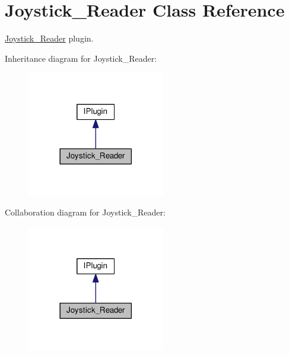 \hypertarget{class_joystick___reader}{}\section{Joystick\+\_\+\+Reader Class Reference}
\label{class_joystick___reader}


\hyperlink{class_joystick___reader}{Joystick\+\_\+\+Reader} plugin.  




Inheritance diagram for Joystick\+\_\+\+Reader\+:\nopagebreak
\begin{figure}[H]
\begin{center}
\leavevmode
\includegraphics[width=170pt]{class_joystick___reader__inherit__graph}
\end{center}
\end{figure}


Collaboration diagram for Joystick\+\_\+\+Reader\+:\nopagebreak
\begin{figure}[H]
\begin{center}
\leavevmode
\includegraphics[width=170pt]{class_joystick___reader__coll__graph}
\end{center}
\end{figure}
